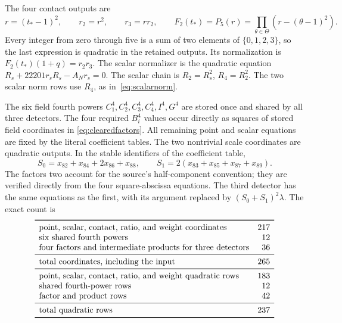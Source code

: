 \documentclass[11pt,a4paper]{article}
\begin{document}
The four contact outputs are
\[
 r=(t_*-1)^2,\qquad r_2=r^2,\qquad r_3=rr_2,\qquad
 F_2(t_*)=P_5(r)=\prod_{\theta\in\Theta}(r-(\theta-1)^2).
\]
Every integer from zero through five is a sum of two elements of
$\{0,1,2,3\}$, so the last expression is quadratic in the retained
outputs. Its normalization is $F_2(t_*)(1+q)=r_2r_3$.
The scalar normalizer is the quadratic equation
$R_s+22201r_sR_s-A_Nr_s=0$.
The scalar chain is $R_2=R_s^2$, $R_4=R_2^2$.
The two scalar norm rows use $R_4$, as in~\eqref{eq:scalarnorm}.

The six field fourth powers $C_1^4,C_2^4,C_3^4,C_4^4,I^4,G^4$
are stored once and shared by all three detectors. The four required
$B_i^4$ values occur directly as squares of stored field
coordinates in \eqref{eq:clearedfactors}. All remaining point and
scalar equations are fixed by the literal coefficient tables.
The two nontrivial scale coordinates are quadratic outputs. In the
stable identifiers of the coefficient table,
\[
 S_0=x_{82}+x_{84}+2x_{86}+x_{88},\qquad
 S_1=2(x_{83}+x_{85}+x_{87}+x_{89}).
\]
The factors two account for the source's half-component convention;
they are verified directly from the four square-abscissa equations.
The third detector has the same equations as the first, with its
argument replaced by $(S_0+S_1)^2\lambda$.
The exact count is
\[
\begin{array}{lr}\toprule
\text{point, scalar, contact, ratio, and weight coordinates}&217\\
\text{six shared fourth powers}&12\\
\text{four factors and intermediate products for three detectors}&36\\\midrule
\text{total coordinates, including the input}&265\\\midrule
\text{point, scalar, contact, ratio, and weight quadratic rows}&183\\
\text{shared fourth-power rows}&12\\
\text{factor and product rows}&42\\\midrule
\text{total quadratic rows}&237\\\bottomrule
\end{array}
\]
\end{document}
